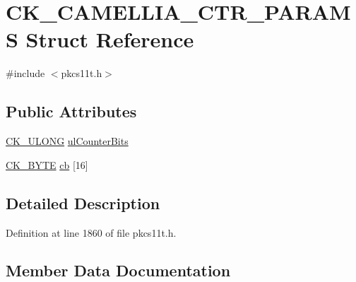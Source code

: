 \hypertarget{struct_c_k___c_a_m_e_l_l_i_a___c_t_r___p_a_r_a_m_s}{}\section{C\+K\+\_\+\+C\+A\+M\+E\+L\+L\+I\+A\+\_\+\+C\+T\+R\+\_\+\+P\+A\+R\+A\+MS Struct Reference}
\label{struct_c_k___c_a_m_e_l_l_i_a___c_t_r___p_a_r_a_m_s}


{\ttfamily \#include $<$pkcs11t.\+h$>$}

\subsection*{Public Attributes}
\begin{DoxyCompactItemize}
\item 
\hyperlink{pkcs11t_8h_a35181858a3b7a0a81f49d180d8f446ef}{C\+K\+\_\+\+U\+L\+O\+NG} \hyperlink{struct_c_k___c_a_m_e_l_l_i_a___c_t_r___p_a_r_a_m_s_acd40627e7750b86612be7f02fdfa5515}{ul\+Counter\+Bits}
\item 
\hyperlink{pkcs11t_8h_a51e605f881c86838bf12d70707b57b85}{C\+K\+\_\+\+B\+Y\+TE} \hyperlink{struct_c_k___c_a_m_e_l_l_i_a___c_t_r___p_a_r_a_m_s_a42e929b9a6ba82f36802ce25fbb0063e}{cb} \mbox{[}16\mbox{]}
\end{DoxyCompactItemize}


\subsection{Detailed Description}


Definition at line 1860 of file pkcs11t.\+h.



\subsection{Member Data Documentation}
\mbox{\label{struct_c_k___c_a_m_e_l_l_i_a___c_t_r___p_a_r_a_m_s_a42e929b9a6ba82f36802ce25fbb0063e}} 
